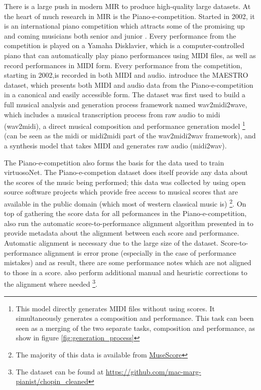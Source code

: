 There is a large push in modern MIR to produce high-quality large datasets. At the heart of much research in MIR is the Piano-e-competition. Started in 2002, it is an international piano competition which attracts some of the promising up and coming musicians both senior and junior \cite{the-disklavier-education-network}. Every performance from the competition is played on a Yamaha Disklavier, which is a computer-controlled piano that can automatically play piano performances using MIDI files, as well as record performances in MIDI form. Every performance from the competition, starting in 2002,is recorded in both MIDI and audio. \citet{hawthorne2018enabling} introduce the MAESTRO dataset, which presents both MIDI and audio data from the Piano-e-competition in a canonical and easily accessible form. The dataset was first used to build a full musical analysis and generation process framework named wav2midi2wave, which includes a musical transcription process \cite{hawthorne2017onsets} from raw audio to midi (wav2midi), a direct musical composition and performance generation model \cite{huang2018music} \footnote{This model directly generates MIDI files without using scores. It simultaneously generates a composition and performance. This task can been seen as a merging of the two separate tasks, composition and performance, as show in figure \ref{fig:generation_process}} (can be seen as the midi or midi2midi part of the wav2midi2wav framework), and a synthesis model that takes MIDI and generates raw audio\cite{oord2016wavenet} (midi2wav). 

The Piano-e-competition also forms the basis for the data used to train virtuosoNet. The Piano-e-competion dataset does itself provide any data about the scores of the music being performed; this data was collected by \citet{jeong2019virtuosonet} using open source software projects which provide free access to musical scores that are available in the public domain (which most of western classical music is) \footnote{The majority of this data is available from \href{https://musescore.com}{MuseScore}}. On top of gathering the score data for all peformances in the Piano-e-competition, \citet{jeong2019virtuosonet} also run the automatic score-to-performance alignment algorithm presented in \cite{nakamura2017performance} to provide metadata about the alignment between each score and performance. Automatic alignment is necessary due to the large size of the dataset. Score-to-performance alignment is error prone (especially in the case of performance mistakes) and as result, there are some performance notes which are not aligned to those in a score. \citet{jeong2019virtuosonet} also perform additional manual and heuristic corrections to the alignment where needed \footnote{The dataset can be found at \url{https://github.com/mac-marg-pianist/chopin_cleaned}}. 

